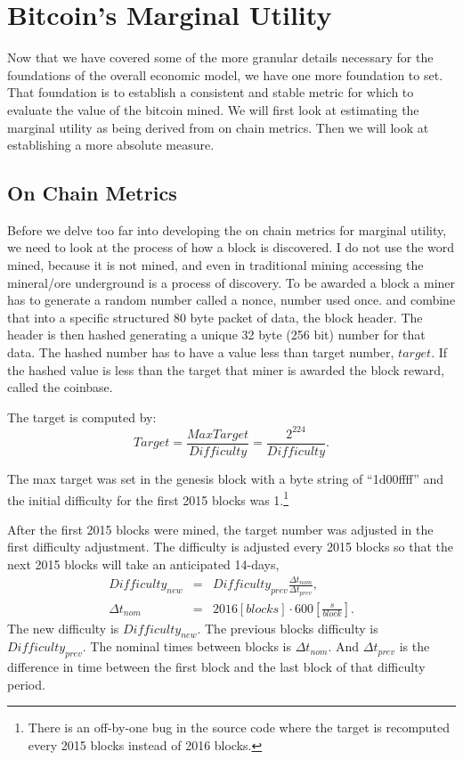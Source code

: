 \documentclass[runningheads]{llncs}
\begin{document}
\section{Bitcoin's Marginal Utility}
Now that we have covered some of the more granular details necessary for the foundations of the overall economic model, we have one more foundation to set.
That foundation is to establish a consistent and stable metric for which to evaluate the value of the bitcoin mined.
We will first look at estimating the marginal utility as being derived from on chain metrics.
Then we will look at establishing a more absolute measure.

\subsection{On Chain Metrics}
Before we delve too far into developing the on chain metrics for marginal utility, we need to look at the process of how a block is discovered.
I do not use the word mined, because it is not mined, and even in traditional mining accessing the mineral/ore underground is a process of discovery.
To be awarded a block a miner has to generate a random number called a nonce, number used once. and combine that into a specific structured 80 byte packet of data, the block header.
The header is then hashed generating a unique 32 byte (256 bit) number for that data.
The hashed number has to have a value less than target number, $target$.
If the hashed value is less than the target that miner is awarded the block reward, called the coinbase.

The target is computed by:
\begin{equation}
    Target=\frac{MaxTarget}{Difficulty}=\frac{2^{224}}{Difficulty}. \label{eq:1}
\end{equation}

The max target was set in the genesis block with a byte string of ``1d00ffff'' and the initial difficulty for the first 2015 blocks was 1.\footnote{
    There is an off-by-one bug in the source code where the target is recomputed every 2015 blocks instead of 2016 blocks.}

After the first 2015 blocks were mined, the target number was adjusted in the first difficulty adjustment.
The difficulty is adjusted every 2015 blocks so that the next 2015 blocks will take an anticipated 14-days,
\begin{eqnarray}
    Difficulty_{new} &=& Difficulty_{prev}\frac{\Delta t_{nom}}{\Delta t_{prev}}, \label{eq:2} \\
    \Delta t_{nom}   &=& 2016 [blocks] \cdot 600[\frac{s}{block}].
\end{eqnarray}
The new difficulty is $Difficulty_{new}$.
The previous blocks difficulty is $Difficulty_{prev}$.
The nominal times between blocks is $\Delta t_{nom}$.
And $\Delta t_{prev}$ is the difference in time between the first block and the last block of that difficulty period.
\end{document}
